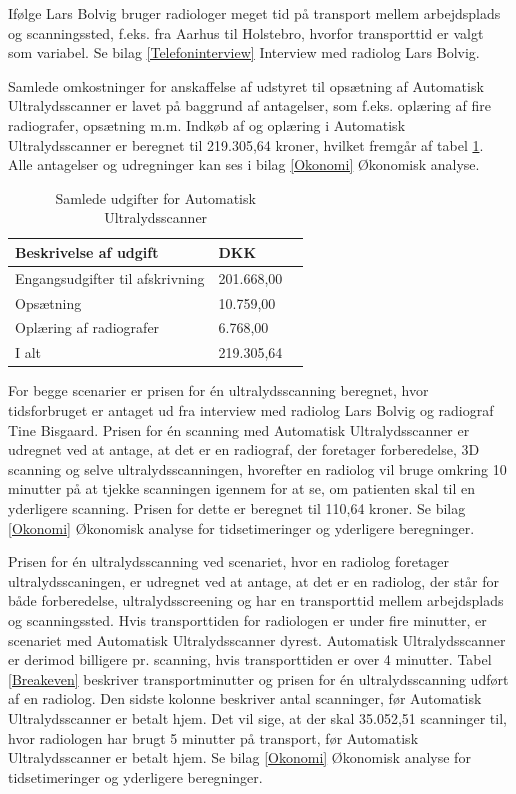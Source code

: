 Ifølge Lars Bolvig bruger radiologer meget tid på transport mellem arbejdsplads og scanningssted, f.eks. fra Aarhus til Holstebro, hvorfor transporttid er valgt som variabel. Se bilag \ref{Telefoninterview} Interview med radiolog Lars Bolvig. 

Samlede omkostninger for anskaffelse af udstyret til opsætning af Automatisk Ultralydsscanner er lavet på baggrund af antagelser, som f.eks. oplæring af fire radiografer, opsætning m.m. Indkøb af og oplæring i Automatisk Ultralydsscanner er beregnet til 219.305,64 kroner, hvilket fremgår af tabel \ref{FasteOmkostninger}. Alle antagelser og udregninger kan ses i bilag \ref{Okonomi} Økonomisk analyse.

\begin{table}[htb]
\centering
\begin{tabular}{ | l | l | p{} | }
\hline
\textbf{Beskrivelse af udgift} & \textbf{DKK} \\\hline
Engangsudgifter til afskrivning & 201.668,00 \\\hline
Opsætning & 10.759,00 \\\hline
Oplæring af radiografer & 6.768,00 \\\hline
I alt & 219.305,64 \\\hline
\end{tabular}
\caption{Samlede udgifter for Automatisk Ultralydsscanner}
\label{FasteOmkostninger}
\end{table}

For begge scenarier er prisen for én ultralydsscanning beregnet, hvor tidsforbruget er antaget ud fra interview med radiolog Lars Bolvig og radiograf Tine Bisgaard. Prisen for én scanning med Automatisk Ultralydsscanner er udregnet ved at antage, at det er en radiograf, der foretager forberedelse, 3D scanning og selve ultralydsscanningen, hvorefter en radiolog vil bruge omkring 10 minutter på at tjekke scanningen igennem for at se, om patienten skal til en yderligere scanning. Prisen for dette er beregnet til 110,64 kroner. Se bilag \ref{Okonomi} Økonomisk analyse for tidsetimeringer og yderligere beregninger. 

Prisen for én ultralydsscanning ved scenariet, hvor en radiolog foretager ultralydsscaningen, er udregnet ved at antage, at det er en radiolog, der står for både forberedelse, ultralydsscreening og har en transporttid mellem arbejdsplads og scanningssted. Hvis transporttiden for radiologen er under fire minutter, er scenariet med Automatisk Ultralydsscanner dyrest. Automatisk Ultralydsscanner er derimod billigere pr. scanning, hvis transporttiden er over 4 minutter. Tabel \ref{Breakeven} beskriver transportminutter og prisen for én ultralydsscanning udført af en radiolog. Den sidste kolonne beskriver antal scanninger, før Automatisk Ultralydsscanner er betalt hjem. Det vil sige, at der skal 35.052,51 scanninger til, hvor radiologen har brugt 5 minutter på transport, før Automatisk Ultralydsscanner er betalt hjem. Se bilag \ref{Okonomi} Økonomisk analyse for tidsetimeringer og yderligere beregninger. 

